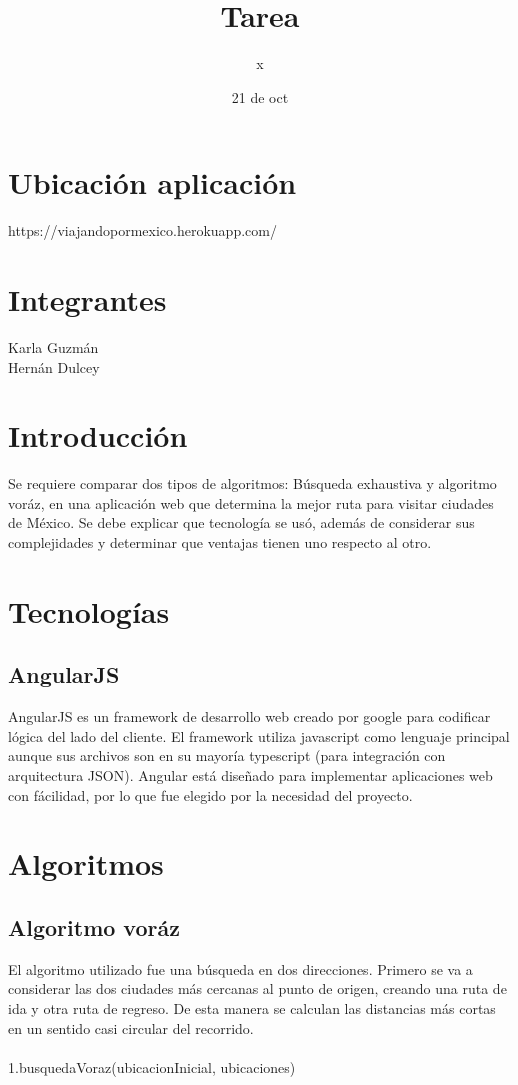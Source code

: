 \documentclass[10pt]{report}
\title{Tarea }
\author{x}
\date{21 de oct}
\begin{document}
\maketitle

\section*{Ubicación aplicación}
https://viajandopormexico.herokuapp.com/

\section*{Integrantes}
Karla Guzmán
\\
Hernán Dulcey

\section*{Introducción}

Se requiere comparar dos tipos de algoritmos: Búsqueda exhaustiva y algoritmo voráz, en una aplicación web que determina la mejor ruta para visitar ciudades de México. Se debe explicar que tecnología se usó, además de considerar sus complejidades y determinar que ventajas tienen uno respecto al otro.

\section*{Tecnologías}

\subsection*{AngularJS}
AngularJS es un framework de desarrollo web creado por google para codificar lógica del lado del cliente. El framework utiliza javascript como lenguaje principal aunque sus archivos son en su mayoría typescript (para integración con arquitectura JSON). Angular está diseñado para implementar aplicaciones web con fácilidad, por lo que fue elegido por la necesidad del proyecto.

\section*{Algoritmos}

\subsection*{Algoritmo voráz}
El algoritmo utilizado fue una búsqueda en dos direcciones. Primero se va a considerar las dos ciudades más cercanas al punto de origen, creando una ruta de ida y otra ruta de regreso. De esta manera se calculan las distancias más cortas en un sentido casi circular del recorrido.
\\
\\
1.busquedaVoraz(ubicacionInicial, ubicaciones)
\end{document}
